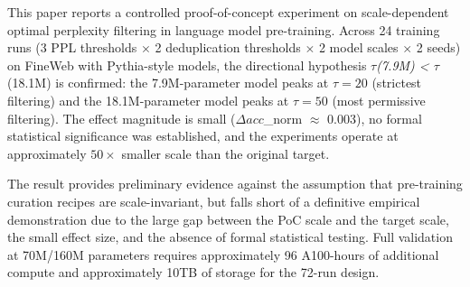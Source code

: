 
This paper reports a controlled proof-of-concept experiment on scale-dependent optimal perplexity filtering in language model pre-training. Across 24 training runs (3 PPL thresholds $\times$ 2 deduplication thresholds $\times$ 2 model scales $\times$ 2 seeds) on FineWeb with Pythia-style models, the directional hypothesis $\tau$\textit{(7.9M) < $\tau$}(18.1M) is confirmed: the 7.9M-parameter model peaks at $\tau =20$ (strictest filtering) and the 18.1M-parameter model peaks at $\tau =50$ (most permissive filtering). The effect magnitude is small ($\Delta acc$\_norm $\approx$ 0.003), no formal statistical significance was established, and the experiments operate at approximately $50\times$ smaller scale than the original target.

The result provides preliminary evidence against the assumption that pre-training curation recipes are scale-invariant, but falls short of a definitive empirical demonstration due to the large gap between the PoC scale and the target scale, the small effect size, and the absence of formal statistical testing. Full validation at 70M/160M parameters requires approximately 96 A100-hours of additional compute and approximately 10TB of storage for the 72-run design.
